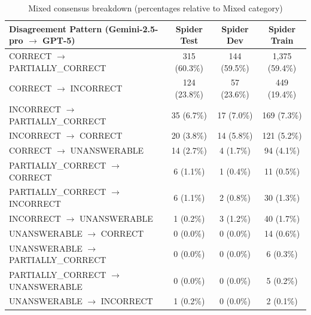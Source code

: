 \documentclass[print]{einformatica}
\begin{document}
\begin{table}[H]
    \caption{Mixed consensus breakdown (percentages relative to Mixed category)}
    \label{tab:mixed_breakdown}
    \centering
    \footnotesize
    \begin{tabular}{lccc}
        \toprule
        \textbf{Disagreement Pattern (Gemini-2.5-pro $\rightarrow$ GPT-5)} & \textbf{Spider Test} & \textbf{Spider Dev} & \textbf{Spider Train} \\
        \midrule
        CORRECT $\rightarrow$ PARTIALLY\_CORRECT & 315 (60.3\%) & 144 (59.5\%) & 1,375 (59.4\%) \\
        CORRECT $\rightarrow$ INCORRECT & 124 (23.8\%) & 57 (23.6\%) & 449 (19.4\%) \\
        INCORRECT $\rightarrow$ PARTIALLY\_CORRECT & 35 (6.7\%) & 17 (7.0\%) & 169 (7.3\%) \\
        INCORRECT $\rightarrow$ CORRECT & 20 (3.8\%) & 14 (5.8\%) & 121 (5.2\%) \\
        CORRECT $\rightarrow$ UNANSWERABLE & 14 (2.7\%) & 4 (1.7\%) & 94 (4.1\%) \\
        PARTIALLY\_CORRECT $\rightarrow$ CORRECT & 6 (1.1\%) & 1 (0.4\%) & 11 (0.5\%) \\
        PARTIALLY\_CORRECT $\rightarrow$ INCORRECT & 6 (1.1\%) & 2 (0.8\%) & 30 (1.3\%) \\
        INCORRECT $\rightarrow$ UNANSWERABLE & 1 (0.2\%) & 3 (1.2\%) & 40 (1.7\%) \\
        UNANSWERABLE $\rightarrow$ CORRECT & 0 (0.0\%) & 0 (0.0\%) & 14 (0.6\%) \\
        UNANSWERABLE $\rightarrow$ PARTIALLY\_CORRECT & 0 (0.0\%) & 0 (0.0\%) & 6 (0.3\%) \\
        PARTIALLY\_CORRECT $\rightarrow$ UNANSWERABLE & 0 (0.0\%) & 0 (0.0\%) & 5 (0.2\%) \\
        UNANSWERABLE $\rightarrow$ INCORRECT & 1 (0.2\%) & 0 (0.0\%) & 2 (0.1\%) \\
        \bottomrule
    \end{tabular}
\end{table}
\end{document}
